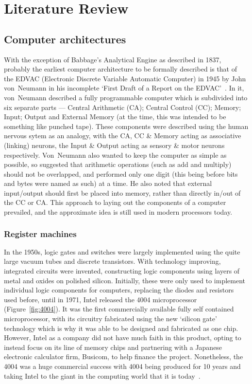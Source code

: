 \chapter{Literature Review}\label{ch:litreview}
\section{Computer architectures}
With the exception of Babbage's Analytical Engine as described in 1837, probably
the earliest computer architecture to be formally described is that of the EDVAC
(Electronic Discrete Variable Automatic Computer) in 1945 by John von~Neumann in
his incomplete `First Draft of a Report on the EDVAC'~\cite{FirstDraft}. In it,
von~Neumann described a fully programmable computer which is subdivided into six
separate parts --- Central Arithmetic (CA); Central Control (CC); Memory; Input;
Output and External Memory (at the time, this was intended to be something like
punched tape). These components were described using the human nervous sytem as
an analogy, with the CA, CC \& Memory acting as associative (linking) neurons,
the Input \& Output acting as sensory \& motor neurons respectively.
Von~Neumann also wanted to keep the computer as simple as possible, so suggested
that arithmetic operations (such as add and multiply) should not be overlapped,
and performed only one digit (this being before bits and bytes were named as
such) at a time. He also noted that external input/output should first be placed
into memory, rather than directly in/out of the CC or CA\@. This approach to
laying out the components of a computer prevailed, and the approximate idea is
still used in modern processors today.

\subsection{Register machines}
In the 1950s, logic gates and switches were largely implemented using the quite
large vacuum tubes and discrete transistors. With technology improving,
integrated circuits were invented, constructing logic components using layers of
metal and oxides on polished silicon. Initially, these were only used to
implement individual logic components for computers, replacing the diodes and
resistors used before, until in 1971, Intel released the 4004 microprocessor
(Figure~\ref{fig:4004}).
It was the first commercially available fully self contained microprocessor,
with its circuitry fabricated using the new `silicon gate' technology which is
why it was able to be designed and fabricated as one chip. However, Intel as a
company did not have much faith in this product, opting to instead focus on its
line of memory chips and partnering with a Japanese electronic calculator firm,
Busicom, to help finance the project. Nonetheless, the 4004 was a huge
commercial success with 4004 being produced for 10 years and taking Intel to the
giant in the computing world that it is today~\cite{Aspray1997Intel}.

